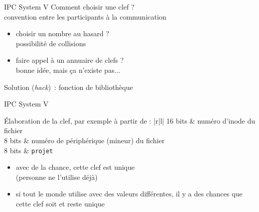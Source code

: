 \begin {frame} {IPC System V}
    Comment choisir une clef ? \\
    \implique convention entre les participants à la
    communication

    \begin {itemize}
	\item choisir un nombre au hasard ? \\
	    \implique possibilité de collisions

	\item faire appel à un annuaire de clefs ? \\
	    \implique bonne idée, mais ça n'existe pas...
    \end {itemize}

    Solution (\textit {hack})~: fonction de bibliothèque 

\end {frame}

\begin {frame} {IPC System V}

    \vspace* {3mm}

    Élaboration de la clef, par exemple à partir de :
    \ctableau {} {|r|l|} {
	16 bits & numéro d'inode du fichier \\
	8 bits & numéro de périphérique (mineur) du fichier \\
	8 bits & \texttt {projet} \\
    }

    \vspace* {3mm}

    \begin {itemize}
	\item avec de la chance, cette clef est unique
	    \\
	    (personne ne l'utilise déjà)
	\item si tout le monde utilise  avec des valeurs
	    différentes, il y a des chances que cette clef soit et reste unique
    \end {itemize}


\end {frame}

